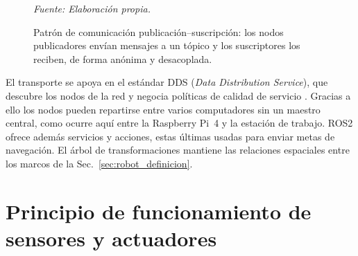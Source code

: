 \begin{figure}[H]
\centering
\setlength{\fboxsep}{6pt}
\shorthandoff{<>}
\shorthandon{<>}

\vspace{4pt}

\caption{Patrón de comunicación publicación--suscripción: los nodos publicadores envían mensajes a un tópico y los suscriptores los reciben, de forma anónima y desacoplada.}
\label{fig:esquema_nodos}

\vspace{2pt}

{\footnotesize\textit{Fuente: Elaboración propia.}}
\end{figure}

El transporte se apoya en el estándar DDS (\textit{Data Distribution Service}), que descubre los nodos de la red y negocia políticas de calidad de servicio \citep{macenski2022ros2}. Gracias a ello los nodos pueden repartirse entre varios computadores sin un maestro central, como ocurre aquí entre la Raspberry Pi~4 y la estación de trabajo. \gls{ROS2} ofrece además servicios y acciones, estas últimas usadas para enviar metas de navegación. El árbol de transformaciones mantiene las relaciones espaciales entre los marcos de la Sec.~\ref{sec:robot_definicion}.

\section{Principio de funcionamiento de sensores y actuadores}
\label{sec:sensores_actuadores}

